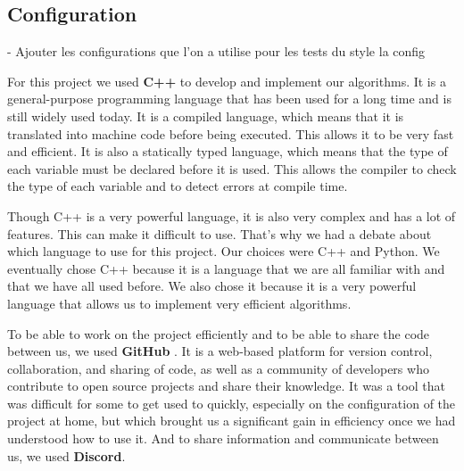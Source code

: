 \subsection{Configuration}

-  Ajouter les configurations que l'on a utilise pour les tests du style la config \bigskip

For this project we used \textbf{C++} to develop and implement our algorithms. 
It is a general-purpose programming language that has been used for a long time 
and is still widely used today. It is a compiled language, which means that it 
is translated into machine code before being executed. This allows it to be very 
fast and efficient. It is also a statically typed language, which means that the 
type of each variable must be declared before it is used. This allows the compiler 
to check the type of each variable and to detect errors at compile time. \bigskip

Though C++ is a very powerful language, it is also very complex and has a lot of
features. This can make it difficult to use. That's why we had a debate about
which language to use for this project. Our choices were C++ and Python. We
eventually chose C++ because it is a language that we are all familiar with and
that we have all used before. We also chose it because it is a very powerful
language that allows us to implement very efficient algorithms. \bigskip

To be able to work on the project efficiently and to be able to share the code
between us, we used \textbf{GitHub}\footnotemark 
{}.
It is a web-based platform for version control, collaboration, and sharing of
code, as well as a community of developers who contribute to open source projects
and share their knowledge. It was a tool that was difficult for some to get used
to quickly, especially on the configuration of the project at home, but which
brought us a significant gain in efficiency once we had understood how to use it.
And to share information and communicate between us, we used \textbf{Discord}.
